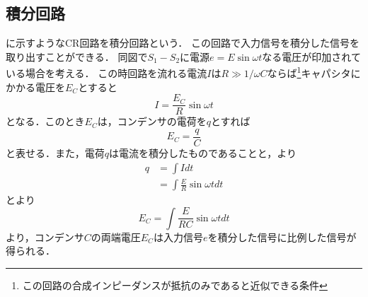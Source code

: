 \subsection{積分回路}
に示すようなCR回路を積分回路という．
この回路で入力信号を積分した信号を取り出すことができる．
同図で$S_{1}-S_{2}$に電源$e=E\sin \omega t$なる電圧が印加されている場合を考える．
この時回路を流れる電流$I$は$R\gg 1/\omega C$ならば\footnote{この回路の合成インピーダンスが抵抗のみであると近似できる条件}キャパシタにかかる電圧を$E_{C}$とすると
\begin{equation}
	I=\frac{E_{C}}{R}\sin \omega t
	\label{eq:I}
\end{equation}
となる．このとき$E_{C}$は，コンデンサの電荷を$q$とすれば
\begin{equation}
	E_{C}=\frac{q}{C}
	\label{eq:qcv}
\end{equation}
と表せる．また，電荷$q$は電流を積分したものであることと，より
\begin{align}
	q&=\int I dt\nonumber \\
	&=\int \frac{E}{R}\sin \omega tdt
	\label{eq:int}
\end{align}
とより
\begin{equation}
	E_{C}=\int \frac{E}{RC} \sin \omega tdt
	\label{eq:sekibun}
\end{equation}
より，コンデンサ$C$の両端電圧$E_{C}$は入力信号$e$を積分した信号に比例した信号が得られる．

